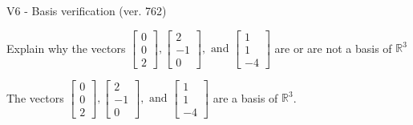 \begin{exercise}
  \begin{exerciseTitle}V6 - Basis verification (ver. 762)\end{exerciseTitle}
  \begin{exerciseStatement}
    Explain why the vectors \(\left[\begin{array}{r}
0 \\
0 \\
2
\end{array}\right] , \left[\begin{array}{r}
2 \\
-1 \\
0
\end{array}\right] , \text{ and } \left[\begin{array}{r}
1 \\
1 \\
-4
\end{array}\right]\) are or are not a basis of \(\mathbb{R}^3\)	


  \end{exerciseStatement}
  \begin{exerciseAnswer}
   The vectors \(\left[\begin{array}{r}
0 \\
0 \\
2
\end{array}\right] , \left[\begin{array}{r}
2 \\
-1 \\
0
\end{array}\right] , \text{ and } \left[\begin{array}{r}
1 \\
1 \\
-4
\end{array}\right]\) 
  	 are  a basis of \(\mathbb{R}^3\).
  


  \end{exerciseAnswer}
\end{exercise}